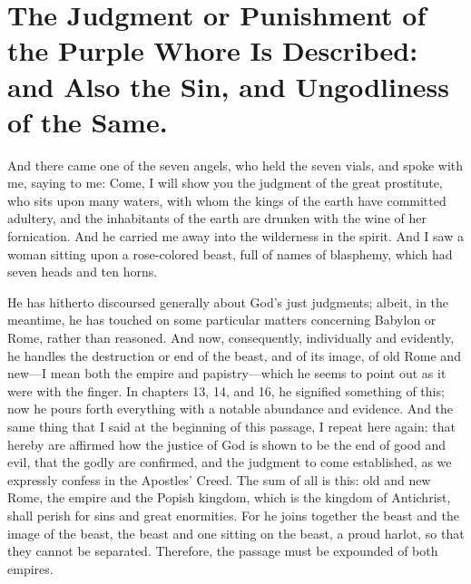 \chapter[Sermon 73. The Judgment or Punishment of the Purple Whore Is Described: and Also the Sin, and Ungodliness of the Same.]{The Judgment or Punishment of the Purple Whore Is Described: and Also the Sin, and Ungodliness of the Same.}
\label{sermon:073}

And there came one of the seven angels, who held the seven vials, and spoke with me, saying to me: Come, I will show you the judgment of the great prostitute, who sits upon many waters, with whom the kings of the earth have committed adultery, and the inhabitants of the earth are drunken with the wine of her fornication. And he carried me away into the wilderness in the spirit. And I saw a woman sitting upon a rose-colored beast, full of names of blasphemy, which had seven heads and ten horns.

He has hitherto discoursed generally about God’s just judgments; albeit, in the meantime, he has touched on some particular matters concerning Babylon or Rome, rather than reasoned. And now, consequently, individually and evidently, he handles the destruction or end of the beast, and of its image, of old Rome and new—I mean both the empire and papistry—which he seems to point out as it were with the finger. In chapters 13, 14, and 16, he signified something of this; now he pours forth everything with a notable abundance and evidence. And the same thing that I said at the beginning of this passage, I repeat here again: that hereby are affirmed how the justice of God is shown to be the end of good and evil, that the godly are confirmed, and the judgment to come established, as we expressly confess in the Apostles’ Creed. The sum of all is this: old and new Rome, the empire and the Popish kingdom, which is the kingdom of Antichrist, shall perish for sins and great enormities. For he joins together the beast and the image of the beast, the beast and one sitting on the beast, a proud harlot, so that they cannot be separated. Therefore, the passage must be expounded of both empires.


